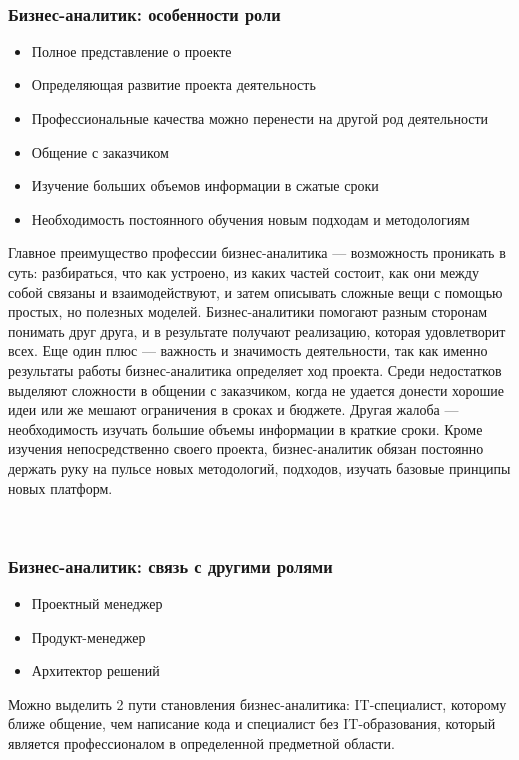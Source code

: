 \documentclass{../industrial-development}
\begin{document}
  ~\cite{Business}

\begin{frame} \frametitle{Бизнес-аналитик: особенности роли}
  \begin{itemize}
  \item Полное представление о проекте
  \item Определяющая развитие проекта деятельность
  \item Профессиональные качества можно перенести на другой род деятельности
  \item Общение с заказчиком
  \item Изучение больших объемов информации в сжатые сроки
  \item Необходимость постоянного обучения новым подходам и методологиям
  \end{itemize}
\end{frame}


\lecturenotes

Главное преимущество профессии бизнес-аналитика — возможность проникать в суть: разбираться, что как устроено, из каких частей состоит, как они между собой связаны и взаимодействуют, и затем описывать сложные вещи с помощью простых, но полезных моделей. Бизнес-аналитики помогают разным сторонам понимать друг друга, и в результате получают реализацию, которая удовлетворит всех. Еще один плюс — важность и значимость деятельности, так как именно результаты работы бизнес-аналитика определяет ход проекта. Среди недостатков выделяют сложности в общении с заказчиком, когда не удается донести хорошие идеи или же мешают ограничения в сроках и бюджете. Другая жалоба — необходимость изучать большие объемы информации в краткие сроки. Кроме изучения непосредственно своего проекта, бизнес-аналитик обязан постоянно держать руку на пульсе новых методологий, подходов, изучать базовые принципы новых платформ.

  ~\cite{Business}

\begin{frame} \frametitle{Бизнес-аналитик: связь с другими ролями}
  \begin{itemize}
  \item Проектный менеджер
  \item Продукт-менеджер
  \item Архитектор решений
  \end{itemize}

\begin{block}{}
	\alert {} Можно выделить 2 пути становления бизнес-аналитика: 
	IT-специалист, которому ближе общение, чем написание кода и специалист без IT-образования, который является профессионалом в определенной предметной области.
\end{block}
\end{frame}
\end{document}
